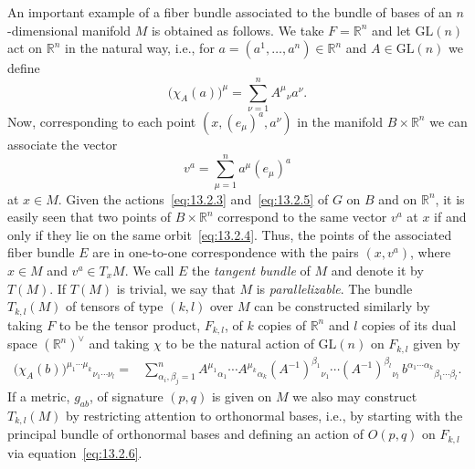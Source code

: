 An important example of a fiber bundle associated to the bundle of bases of an
\(n\)-dimensional manifold \(M\) is obtained as follows. We take \(F=\mathbb R^n\)
and let \(\mathrm{GL}(n)\) act on \(\mathbb R^n\) in the natural way, i.e., for
\(a=(a^1,\ldots,a^n)\in\mathbb R^n\) and \(A\in\mathrm{GL}(n)\) we define
\begin{equation}
  \bigl(\chi_A(a)\bigr)^\mu=\sum_{\nu=1}^nA^\mu{}_\nu a^\nu.
  \tag{13.2.5}\label{eq:13.2.5}
\end{equation}
Now, corresponding to each point \((x,(e_\mu)^a,a^\nu)\) in the manifold
\(B\times\mathbb R^n\) we can associate the vector
\[
  v^a=\sum_{\mu=1}^n a^\mu(e_\mu)^a
\]
at \(x\in M\). Given the actions~\eqref{eq:13.2.3} and~\eqref{eq:13.2.5} of \(G\)
on \(B\) and on \(\mathbb R^n\), it is easily seen that two points of
\(B\times\mathbb R^n\) correspond to the same vector \(v^a\) at \(x\) if and only if
they lie on the same orbit~\eqref{eq:13.2.4}. Thus, the points of the associated
fiber bundle \(E\) are in one-to-one correspondence with the pairs \((x,v^a)\),
where \(x\in M\) and \(v^a\in T_xM\). We call \(E\) the \emph{tangent bundle} of
\(M\) and denote it by \(T(M)\). If \(T(M)\) is trivial, we say that \(M\) is
\emph{parallelizable}. The bundle \(T_{k,l}(M)\) of tensors of type \((k,l)\) over
\(M\) can be constructed similarly by taking \(F\) to be the tensor product,
\(F_{k,l}\), of \(k\) copies of \(\mathbb R^n\) and \(l\) copies of its dual space
\((\mathbb R^n)^\vee\) and taking \(\chi\) to be the natural action of
\(\mathrm{GL}(n)\) on \(F_{k,l}\) given by
\begin{align}
  \bigl(\chi_A(b)\bigr)^{\mu_1\cdots\mu_k}{}_{\nu_1\cdots\nu_l}
  ={}&\sum_{\alpha_i,\beta_j=1}^n
  A^{\mu_1}{}_{\alpha_1}\cdots A^{\mu_k}{}_{\alpha_k}
  (A^{-1})^{\beta_1}{}_{\nu_1}\cdots
  (A^{-1})^{\beta_l}{}_{\nu_l}\,
  b^{\alpha_1\cdots\alpha_k}{}_{\beta_1\cdots\beta_l}.
  \tag{13.2.6}\label{eq:13.2.6}
\end{align}
If a metric, \(g_{ab}\), of signature \((p,q)\) is given on \(M\) we also may
construct \(T_{k,l}(M)\) by restricting attention to orthonormal bases, i.e., by
starting with the principal bundle of orthonormal bases and defining an action of
\(O(p,q)\) on \(F_{k,l}\) via equation~\eqref{eq:13.2.6}.

